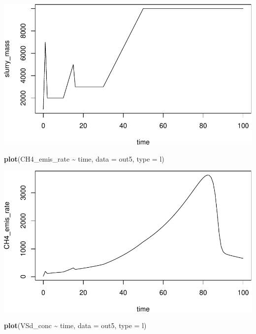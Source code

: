 \documentclass[
]{article}
\newenvironment{Shaded}{\begin{snugshade}}{\end{snugshade}}
\newcommand{\AttributeTok}[1]{\textcolor[rgb]{0.13,0.29,0.53}{#1}}
\newcommand{\FunctionTok}[1]{\textcolor[rgb]{0.13,0.29,0.53}{\textbf{#1}}}
\newcommand{\NormalTok}[1]{#1}
\newcommand{\SpecialCharTok}[1]{\textcolor[rgb]{0.81,0.36,0.00}{\textbf{#1}}}
\newcommand{\StringTok}[1]{\textcolor[rgb]{0.31,0.60,0.02}{#1}}
\begin{document}
\includegraphics{simple_demo_files/figure-latex/unnamed-chunk-36-1.pdf}

\begin{Shaded}
\begin{Highlighting}[]
\FunctionTok{plot}\NormalTok{(CH4\_emis\_rate }\SpecialCharTok{\textasciitilde{}}\NormalTok{ time, }\AttributeTok{data =}\NormalTok{ out5, }\AttributeTok{type =} \StringTok{\textquotesingle{}l\textquotesingle{}}\NormalTok{)}
\end{Highlighting}
\end{Shaded}

\includegraphics{simple_demo_files/figure-latex/unnamed-chunk-36-2.pdf}

\begin{Shaded}
\begin{Highlighting}[]
\FunctionTok{plot}\NormalTok{(VSd\_conc }\SpecialCharTok{\textasciitilde{}}\NormalTok{ time, }\AttributeTok{data =}\NormalTok{ out5, }\AttributeTok{type =} \StringTok{\textquotesingle{}l\textquotesingle{}}\NormalTok{)}
\end{Highlighting}
\end{Shaded}
\end{document}
